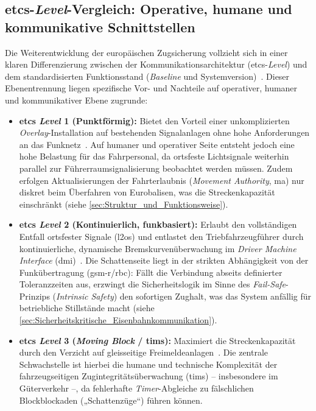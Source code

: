 \documentclass[runningheads]{res/llncs}
\begin{document}
\subsection{\texorpdfstring{\gls{etcs}-\textit{Level}-Vergleich: Operative, humane und kommunikative Schnittstellen}{ETCS-Level-Vergleich: Operative, humane und kommunikative Schnittstellen}}
\label{sec:ETCS-Level-Vergleich_Operative_humane_und_kommunikative_Schnittstellen}
Die Weiterentwicklung der europäischen Zugsicherung vollzieht sich in einer klaren Differenzierung zwischen der Kommunikationsarchitektur (\gls{etcs}-\textit{Level}) und dem standardisierten Funktionsstand (\textit{Baseline} und Systemversion)~\parencite[S. 50--53]{trinckaufETCS2024}. Dieser Ebenentrennung liegen spezifische Vor- und Nachteile auf operativer, humaner und kommunikativer Ebene zugrunde:

\begin{itemize}
    \item \textbf{\gls{etcs} \textit{Level} 1 (Punktförmig):} Bietet den Vorteil einer unkomplizierten \textit{Overlay}-Installation auf bestehenden Signalanlagen ohne hohe Anforderungen an das Funknetz~\parencite[S. 71]{trinckaufETCS2024}. Auf humaner und operativer Seite entsteht jedoch eine hohe Belastung für das Fahrpersonal, da ortsfeste Lichtsignale weiterhin parallel zur Führerraumsignalisierung beobachtet werden müssen. Zudem erfolgen Aktualisierungen der Fahrterlaubnis (\textit{Movement Authority}, \gls{ma}) nur diskret beim Überfahren von Eurobalisen, was die Streckenkapazität einschränkt (siehe \autoref{sec:Struktur_und_Funktionsweise}).
    \item \textbf{\gls{etcs} \textit{Level} 2 (Kontinuierlich, funkbasiert):} Erlaubt den vollständigen Entfall ortsfester Signale (\gls{l2os}) und entlastet den Triebfahrzeugführer durch kontinuierliche, dynamische Bremskurvenüberwachung im \textit{Driver Machine Interface} (\gls{dmi})~\parencite[S. 89--90]{trinckaufETCS2024}. Die Schattenseite liegt in der strikten Abhängigkeit von der Funkübertragung (\gls{gsm-r}/\gls{rbc}): Fällt die Verbindung abseits definierter Toleranzzeiten aus, erzwingt die Sicherheitslogik im Sinne des \textit{Fail-Safe}-Prinzips (\textit{Intrinsic Safety}) den sofortigen Zughalt, was das System anfällig für betriebliche Stillstände macht (siehe \autoref{sec:Sicherheitskritische_Eisenbahnkommunikation}).
    \item \textbf{\gls{etcs} \textit{Level} 3 (\textit{Moving Block} / \gls{tims}):} Maximiert die Streckenkapazität durch den Verzicht auf gleisseitige Freimeldeanlagen~\parencite[S. 471--472]{trinckaufETCS2024}. Die zentrale Schwachstelle ist hierbei die humane und technische Komplexität der fahrzeugseitigen Zugintegritätsüberwachung (\gls{tims}) – insbesondere im Güterverkehr –, da fehlerhafte \textit{Timer}-Abgleiche zu fälschlichen Blockblockaden („Schattenzüge“) führen können.
\end{itemize}
\end{document}
